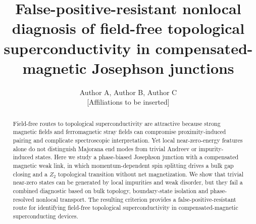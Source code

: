 \documentclass[11pt]{article}
\title{\textbf{False-positive-resistant nonlocal diagnosis of field-free topological superconductivity in compensated-magnetic Josephson junctions}}
\author{Author A, Author B, Author C\\
\small [Affiliations to be inserted]}
\date{}
\begin{document}
\maketitle

\begin{abstract}
Field-free routes to topological superconductivity are attractive because strong magnetic fields and ferromagnetic stray fields can compromise proximity-induced pairing and complicate spectroscopic interpretation. Yet local near-zero-energy features alone do not distinguish Majorana end modes from trivial Andreev or impurity-induced states. Here we study a phase-biased Josephson junction with a compensated magnetic weak link, in which momentum-dependent spin splitting drives a bulk gap closing and a $Z_2$ topological transition without net magnetization. We show that trivial near-zero states can be generated by local impurities and weak disorder, but they fail a combined diagnostic based on bulk topology, boundary-state isolation and phase-resolved nonlocal transport. The resulting criterion provides a false-positive-resistant route for identifying field-free topological superconductivity in compensated-magnetic superconducting devices.
\end{abstract}

%
%
\end{document}
